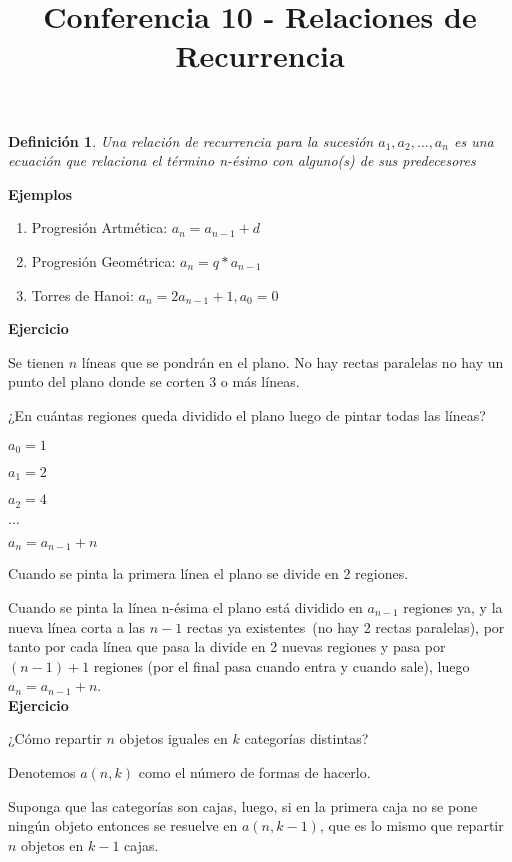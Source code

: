 \documentclass[a4paper,12pt]{report}
\title{Conferencia 10 - Relaciones de Recurrencia}
\author{}
\newtheorem*{dfn}{Definición}
\begin{document}
\maketitle



\begin{dfn}
 Una relación de recurrencia para la sucesión $a_1, a_2,\dots, a_n$ es una ecuación que relaciona el término n-ésimo con alguno(s) de sus predecesores
\end{dfn}

\textbf{Ejemplos}

\begin{enumerate}
 \item Progresión Artmética: $a_n=a_{n-1}+d$
 \item Progresión Geométrica: $a_n=q*a_{n-1}$
 \item Torres de Hanoi: $a_n = 2a_{n-1}+1,a_0=0$
\end{enumerate}

\textbf{Ejercicio}

Se tienen $n$ líneas que se pondrán en el plano. No hay rectas paralelas no
hay un punto del plano donde se corten 3 o más líneas.

¿En cuántas regiones queda dividido el plano luego de pintar todas las líneas?

$a_0=1$

$a_1=2$

$a_2=4$

$\dots$

$a_n=a_{n-1}+n$

Cuando se pinta la primera línea el plano se divide en 2 regiones.

Cuando se pinta la línea n-ésima el plano está dividido en $a_{n-1}$ regiones ya, y la nueva línea corta a las $n-1$ rectas ya existentes~(no hay 2 rectas paralelas), por tanto por cada l\'inea que pasa la divide en 2 nuevas regiones y pasa por $(n-1)+1$ regiones (por el final pasa cuando entra y cuando sale), luego $a_n=a_{n-1}+n$.\\


\textbf{Ejercicio}

¿Cómo repartir $n$ objetos iguales en $k$ categorías distintas?

Denotemos $a(n,k)$ como el número de formas de hacerlo.

Suponga que las categorías son cajas, luego, si en la primera caja no se pone ningún objeto entonces se resuelve en $a(n,k-1)$, que es lo mismo que repartir $n$ objetos en $k-1$ cajas.
\end{document}
